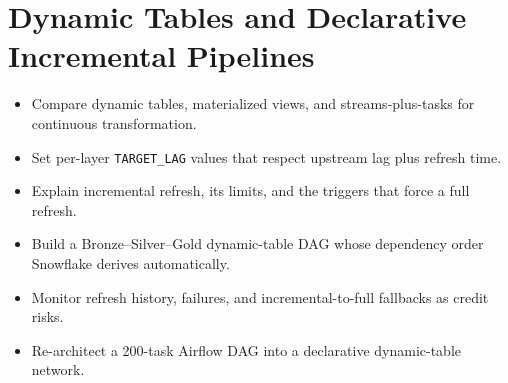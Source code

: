 \chapter{Dynamic Tables and Declarative Incremental Pipelines}
%
\begin{objectives}
\begin{itemize}
    \item Compare dynamic tables, materialized views, and streams-plus-tasks for continuous transformation.
    \item Set per-layer \texttt{TARGET\_LAG} values that respect upstream lag plus refresh time.
    \item Explain incremental refresh, its limits, and the triggers that force a full refresh.
    \item Build a Bronze--Silver--Gold dynamic-table DAG whose dependency order Snowflake derives automatically.
    \item Monitor refresh history, failures, and incremental-to-full fallbacks as credit risks.
    \item Re-architect a 200-task Airflow DAG into a declarative dynamic-table network.
\end{itemize}
\end{objectives}

